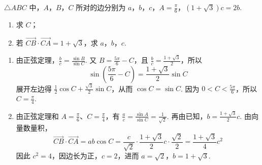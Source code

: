 \begin{problem}
\(\triangle ABC\) 中，\(A\)，\(B\)，\(C\) 所对的边分别为 \(a\)，\(b\)，\(c\)，\(A = \frac{\pi}{6}\)，\((1 + \sqrt{3})c = 2b\).

\begin{enumerate}
\item 求 \(C\)；
\item 若 \(\overrightarrow{CB} \cdot \overrightarrow{CA} = 1 + \sqrt{3}\)，求 \(a\)，\(b\)，\(c\).
\end{enumerate}
\begin{solution}
\begin{enumerate}
\item
由正弦定理，\(\frac{b}{c}=\frac{\sin B}{\sin C}\). 又 \(B=\frac{5\pi}{6}-C\)，且 \(\frac{b}{c}=\frac{1+\sqrt3}{2}\)，所以
\[
\sin\left(\frac{5\pi}{6}-C\right)=\frac{1+\sqrt3}{2}\sin C
\]
展开左边得 \(\frac12\cos C+\frac{\sqrt3}{2}\sin C\)，从而 \(\cos C=\sin C\). 因为 \(0<C<\frac{5\pi}{6}\)，所以 \(C=\frac{\pi}{4}\).

\item
由正弦定理和 \(A=\frac{\pi}{6}\)、\(C=\frac{\pi}{4}\)，有 \(\frac{a}{c}=\frac{\sin A}{\sin C}=\frac1{\sqrt2}\). 再由已知，\(b=\frac{1+\sqrt3}{2}c\). 由向量数量积，
\[
\overrightarrow{CB}\cdot\overrightarrow{CA}=ab\cos C
=\frac{c}{\sqrt2}\cdot\frac{1+\sqrt3}{2}c\cdot\frac{\sqrt2}{2}
=\frac{1+\sqrt3}{4}c^{2}
\]
因此 \(c^{2}=4\)，因边长为正，\(c=2\)，进而 \(a=\sqrt2\)，\(b=1+\sqrt3\).
\end{enumerate}
\end{solution}
\end{problem}

